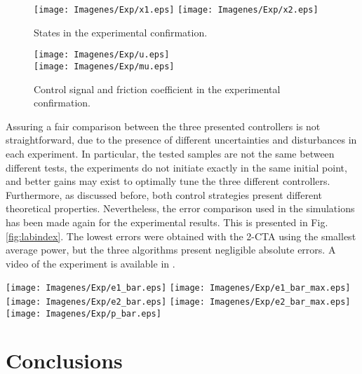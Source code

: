 \documentclass[journal,twoside,web]{ieeecolor}
\begin{document}
\begin{figure}[ht!]
  \centering 
  \hspace{15pt}\texttt{[image: Imagenes/Exp/x1.eps]}
  \texttt{[image: Imagenes/Exp/x2.eps]}
  \caption{States in the experimental confirmation.}
  \label{fig:xe}
\end{figure}

\begin{figure}[ht!]
  \centering 
  \texttt{[image: Imagenes/Exp/u.eps]} \\ \vspace{3pt}
  \hspace{6pt}\texttt{[image: Imagenes/Exp/mu.eps]}
  \caption{Control signal and friction coefficient in the experimental confirmation.}
  \label{fig:pe}
\end{figure}

Assuring a fair comparison between the three presented controllers is not straightforward, due to the presence of different uncertainties and disturbances in each experiment. In particular, the tested samples are not the same between different tests, the experiments do not initiate exactly in the same initial point, and better gains may exist to optimally tune the three different controllers. Furthermore, as discussed before, both control strategies present different theoretical properties. Nevertheless, the error comparison used in the simulations has been made again for the experimental results. This is presented in Fig. \ref{fig:labindex}. The lowest errors were obtained with the 2-CTA using the smallest average power, but the three algorithms present negligible absolute errors. A video of the experiment is available in \cite{b:CoQuake_video}. 

\begin{figure*}[ht!]
  \centering 
  \texttt{[image: Imagenes/Exp/e1\_bar.eps]}
  \texttt{[image: Imagenes/Exp/e1\_bar\_max.eps]}
  \texttt{[image: Imagenes/Exp/e2\_bar.eps]}
  \texttt{[image: Imagenes/Exp/e2\_bar\_max.eps]}
  \texttt{[image: Imagenes/Exp/p\_bar.eps]}
  \caption{Errors and average power comparison in the experiments.}
  \label{fig:labindex}
\end{figure*}

\section{Conclusions}
\label{sec:Conclusions}
\end{document}
